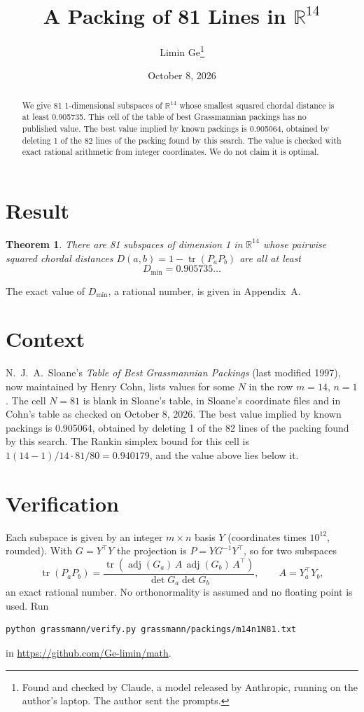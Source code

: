 \documentclass[11pt,a4paper]{article}
\title{A Packing of 81 Lines in $\mathbb{R}^{14}$}
\author{Limin Ge\thanks{Found and checked by Claude, a model released by Anthropic, running on the author's laptop. The author sent the prompts.}}
\date{October 8, 2026}
\newtheorem*{theorem}{Theorem}
\begin{document}
\maketitle
\begin{abstract}
We give 81 1-dimensional subspaces of $\mathbb{R}^{14}$ whose smallest squared chordal distance is at least 0.905735. This cell of the table of best Grassmannian packings has no published value. The best value implied by known packings is 0.905064, obtained by deleting 1 of the 82 lines of the packing found by this search. The value is checked with exact rational arithmetic from integer coordinates. We do not claim it is optimal.
\end{abstract}

\section{Result}
\begin{theorem}
There are 81 subspaces of dimension 1 in $\mathbb{R}^{14}$ whose pairwise squared chordal distances $D(a,b) = 1 - \operatorname{tr}(P_aP_b)$ are all at least
\[ D_{\min} = 0.905735\ldots \]
\end{theorem}
The exact value of $D_{\min}$, a rational number, is given in Appendix~A.


\section{Context}
N.~J.~A.~Sloane's \emph{Table of Best Grassmannian Packings} (last modified 1997), now maintained by Henry Cohn, lists values for some $N$ in the row $m=14$, $n=1$. The cell $N=81$ is blank in Sloane's table, in Sloane's coordinate files and in Cohn's table as checked on October 8, 2026. The best value implied by known packings is 0.905064, obtained by deleting 1 of the 82 lines of the packing found by this search. The Rankin simplex bound for this cell is $1(14-1)/14\cdot 81/80 = 0.940179$, and the value above lies below it.


\section{Verification}
Each subspace is given by an integer $m\times n$ basis $Y$ (coordinates times $10^{12}$, rounded). With $G=Y^\top Y$ the projection is $P=YG^{-1}Y^\top$, so for two subspaces
\[ \operatorname{tr}(P_aP_b)=\frac{\operatorname{tr}(\operatorname{adj}(G_a)\,A\,\operatorname{adj}(G_b)\,A^\top)}{\det G_a\det G_b},\qquad A=Y_a^\top Y_b, \]
an exact rational number. No orthonormality is assumed and no floating point is used. Run
\begin{verbatim}
python grassmann/verify.py grassmann/packings/m14n1N81.txt
\end{verbatim}
in \url{https://github.com/Ge-limin/math}.
\end{document}
